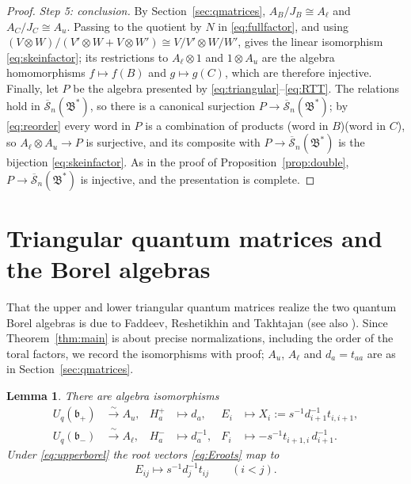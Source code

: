 \documentclass[12pt]{article}
\newtheorem{lemma}[theorem]{Lemma}
\theoremstyle{remark}
\newcommand{\U}{U_q}
\newcommand{\bp}{\mathfrak b_+}
\newcommand{\bm}{\mathfrak b_-}
\newcommand{\redS}{\overline{\mathcal S}_n}
\newcommand{\Bstar}{\mathfrak B^*}
\newcommand{\ot}{\otimes}
\begin{document}
\begin{proof}
\emph{Step 5: conclusion.}
By Section~\ref{sec:qmatrices}, $A_B/J_B\cong A_\ell$ and
$A_C/J_C\cong A_u$. Passing to the quotient by $N$ in
\eqref{eq:fullfactor}, and using
$(V\ot W)/(V'\ot W+V\ot W')\cong V/V'\ot W/W'$, gives the linear
isomorphism \eqref{eq:skeinfactor}; its restrictions to
$A_\ell\ot1$ and $1\ot A_u$ are the algebra homomorphisms
$f\mapsto f(B)$ and $g\mapsto g(C)$, which are therefore injective.
Finally, let $P$ be the algebra presented by
\eqref{eq:triangular}--\eqref{eq:RTT}. The relations hold in
$\redS(\Bstar)$, so there is a canonical surjection $P\to\redS(\Bstar)$;
by \eqref{eq:reorder} every word in $P$ is a combination of products
(word in $B$)(word in $C$), so $A_\ell\ot A_u\to P$ is surjective, and
its composite with $P\to\redS(\Bstar)$ is the bijection
\eqref{eq:skeinfactor}. As in the proof of
Proposition~\ref{prop:double}, $P\to\redS(\Bstar)$ is injective, and
the presentation is complete.
\end{proof}

\section{Triangular quantum matrices and the Borel algebras}\label{sec:borel}

That the upper and lower triangular quantum matrices realize the two
quantum Borel algebras is due to Faddeev, Reshetikhin and Takhtajan
\cite{FRT} (see also \cite[Section 8.5]{KS}). Since
Theorem~\ref{thm:main} is about precise normalizations, including the
order of the toral factors, we record the isomorphisms with proof;
$A_u$, $A_\ell$ and $d_a=t_{aa}$ are as in Section~\ref{sec:qmatrices}.

\begin{lemma}\label{lem:borel}
There are algebra isomorphisms
\begin{align}
 \U(\bp)&\xrightarrow{\ \sim\ }A_u,&
 H^+_a&\longmapsto d_a,&
 E_i&\longmapsto X_i:=s^{-1}d_{i+1}^{-1}t_{i,i+1}, \label{eq:upperborel}\\
 \U(\bm)&\xrightarrow{\ \sim\ }A_\ell,&
 H^-_a&\longmapsto d_a^{-1},&
 F_i&\longmapsto -s^{-1}t_{i+1,i}\,d_{i+1}^{-1}. \label{eq:lowerborel}
\end{align}
Under \eqref{eq:upperborel} the root vectors \eqref{eq:Eroots} map to
\begin{equation}\label{eq:rootimageborel}
 E_{ij}\longmapsto s^{-1}d_j^{-1}t_{ij}\qquad(i<j).
\end{equation}
\end{lemma}
\end{document}
